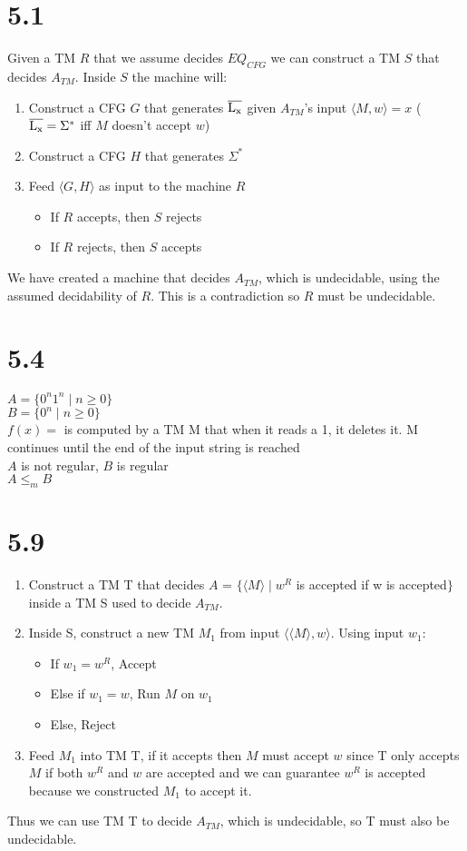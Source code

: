 \documentclass{article}
\begin{document}
\section*{5.1}
Given a TM $R$ that we assume decides $EQ_{CFG}$ we can construct a TM $S$ that decides $A_{TM}$. Inside $S$ the machine will:

\begin{enumerate}
    \item Construct a CFG $G$ that generates $\overline{\rm L_x}$ given $A_{TM}$'s input $\langle M, w\rangle = x$ ($\overline{\rm L_x} = \Sigma^*$ iff $M$ doesn't accept $w$)
    \item Construct a CFG $H$ that generates $\Sigma^*$
    \item Feed $\langle G, H \rangle$ as input to the machine $R$
    \begin{itemize}
        \item If $R$ accepts, then $S$ rejects
        \item If $R$ rejects, then $S$ accepts
    \end{itemize}
\end{enumerate}
We have created a machine that decides $A_{TM}$, which is undecidable, using the assumed decidability of $R$. This is a contradiction so $R$ must be undecidable.

\section*{5.4}
$A = \{0^n1^n \mid n \geq 0\}$\\
$B = \{0^n \mid n \geq 0\}$\\
$f(x)= $ is computed by a TM M that when it reads a 1, it deletes it. M continues until the end of the input string is reached\\
$A$ is not regular, $B$ is regular\\
$A \leq_m B$
\section*{5.9}

\begin{enumerate}
    \item Construct a TM T that decides $A$ = $\{ \langle M \rangle \mid w^R$ is accepted if w is accepted$\}$ inside a TM S used to decide $A_{TM}$.
    \item Inside S, construct a new TM $M_1$ from input $\langle \langle M\rangle, w \rangle$. Using input $w_1$:
    \begin{itemize}
        \item If $w_1 = w^R$, Accept
        \item Else if $w_1 = w$, Run $M$ on $w_1$
        \item Else, Reject 
    \end{itemize}
    \item Feed ${M_1}$ into TM T, if it accepts then $M$ must accept $w$ since T only accepts ${M}$ if both $w^R$ and $w$ are accepted and we can guarantee $w^R$ is accepted because we constructed $M_1$ to accept it.
\end{enumerate}
Thus we can use TM T to decide $A_{TM}$, which is undecidable, so T must also be undecidable.
\end{document}
